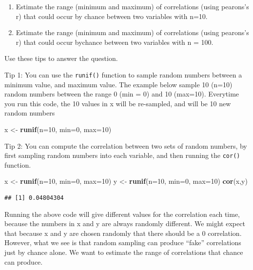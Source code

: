 \documentclass[]{book}
\newenvironment{Shaded}{\begin{snugshade}}{\end{snugshade}}
\newcommand{\KeywordTok}[1]{\textcolor[rgb]{0.13,0.29,0.53}{\textbf{#1}}}
\newcommand{\DataTypeTok}[1]{\textcolor[rgb]{0.13,0.29,0.53}{#1}}
\newcommand{\DecValTok}[1]{\textcolor[rgb]{0.00,0.00,0.81}{#1}}
\newcommand{\StringTok}[1]{\textcolor[rgb]{0.31,0.60,0.02}{#1}}
\newcommand{\NormalTok}[1]{#1}
\begin{document}
\begin{enumerate}
\def\labelenumi{\arabic{enumi}.}
\item
  Estimate the range (minimum and maximum) of correlations (using
  pearons's r) that could occur by chance between two variables with
  n=10.
\item
  Estimate the range (minimum and maximum) of correlations (using
  pearons's r) that could occur bychance between two variables with n =
  100.
\end{enumerate}

Use these tips to answer the question.

Tip 1: You can use the \texttt{runif()} function to sample random
numbers between a minimum value, and maximum value. The example below
sample 10 (n=10) random numbers between the range 0 (min = 0) and 10
(max=10). Everytime you run this code, the 10 values in x will be
re-sampled, and will be 10 new random numbers

\begin{Shaded}
\begin{Highlighting}[]
\NormalTok{x <-}\StringTok{ }\KeywordTok{runif}\NormalTok{(}\DataTypeTok{n=}\DecValTok{10}\NormalTok{, }\DataTypeTok{min=}\DecValTok{0}\NormalTok{, }\DataTypeTok{max=}\DecValTok{10}\NormalTok{)}
\end{Highlighting}
\end{Shaded}

Tip 2: You can compute the correlation between two sets of random
numbers, by first sampling random numbers into each variable, and then
running the \texttt{cor()} function.

\begin{Shaded}
\begin{Highlighting}[]
\NormalTok{x <-}\StringTok{ }\KeywordTok{runif}\NormalTok{(}\DataTypeTok{n=}\DecValTok{10}\NormalTok{, }\DataTypeTok{min=}\DecValTok{0}\NormalTok{, }\DataTypeTok{max=}\DecValTok{10}\NormalTok{)}
\NormalTok{y <-}\StringTok{ }\KeywordTok{runif}\NormalTok{(}\DataTypeTok{n=}\DecValTok{10}\NormalTok{, }\DataTypeTok{min=}\DecValTok{0}\NormalTok{, }\DataTypeTok{max=}\DecValTok{10}\NormalTok{)}
\KeywordTok{cor}\NormalTok{(x,y)}
\end{Highlighting}
\end{Shaded}

\begin{verbatim}
## [1] 0.04804304
\end{verbatim}

Running the above code will give different values for the correlation
each time, because the numbers in x and y are always randomly different.
We might expect that because x and y are chosen randomly that there
should be a 0 correlation. However, what we see is that random sampling
can produce ``fake'' correlations just by chance alone. We want to
estimate the range of correlations that chance can produce.
\end{document}
